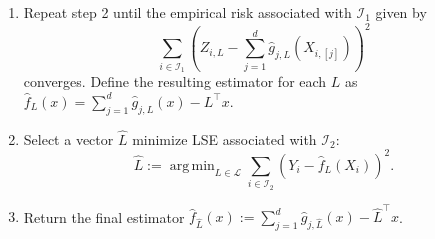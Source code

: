 \documentclass[12pt]{article}
\DeclareMathOperator*{\argmin}{arg\,min}
\begin{document}
\begin{appendices}
\begin{algorithm}
\begin{algorithmic}
\begin{enumerate}
    Specifically, we minimize the LSE for each coordinate
    \[\widehat g_{\ell, L}:= \argmin_{g\in\mathcal{C}(1)}\sum_{i\in \mathcal{I}_1}\left\{\left(Z_{i, L}-\sum_{j\neq \ell}\widehat g_{j}(X_{i,[j]})\right)-g(X_{i,[\ell]})\right\}^2\]
iteratively while keeping the estimators of the remaining coordinates fixed.
    \item Repeat step 2 until the empirical risk associated with $\mathcal{I}_1$ given by 
    \[\sum_{i\in \mathcal{I}_1}\left(Z_{i, L}-\sum_{j=1}^d \widehat g_{j,L}(X_{i,[j]})\right)^2\]
    converges. Define the resulting estimator for each $L$ as $\widehat f_{L}(x) = \sum_{j=1}^d \widehat g_{j,L}(x) - L^{\top}x$.
     \item Select a vector $\widehat L$ minimize LSE associated with $\mathcal{I}_2$:
    \[\widehat L := \argmin_{L \in \mathcal{L}} \sum_{i\in\mathcal{I}_2} (Y_i-\widehat f_{L}(X_i))^2.\]
    \item Return the final estimator $\widehat f_{\widehat L}(x) :=  \sum_{j=1}^d \widehat g_{j, \widehat L}(x) - \widehat L^{\top}x$.
\end{enumerate}
\end{algorithmic}
\end{algorithm}


\end{appendices}
\end{document}
